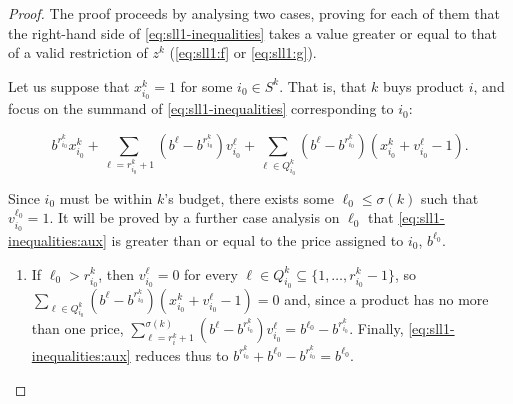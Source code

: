 \begin{proof}
    The proof proceeds by analysing two cases, proving for each of them that the
    right-hand side of \eqref{eq:sll1-inequalities} takes a value greater or
    equal to that of a valid restriction of $z^k$ (\eqref{eq:sll1:f} or
    \eqref{eq:sll1:g}).

    Let us suppose that $x_{i_0}^k=1$ for some $i_0 \in S^k$. That is, that $k$
    buys product $i$, and focus on the summand of \eqref{eq:sll1-inequalities}
    corresponding to $i_0$:

    \begin{equation}
        b^{r_{i_0}^k}x_{i_0}^k
            + \sum_{\ell = r_{i_0}^k + 1}
                \left(
                    b^\ell - b^{r_{i_0}^k}
                \right) v_{i_0}^\ell
            + \sum_{\ell \in Q_{i_0}^k  }
                \left(
                    b^\ell - b^{r_{i_0}^k}
                \right)
                \left(
                    x_{i_0}^k + v_{i_0}^\ell - 1
                \right).
        \label{eq:sll1-inequalities:aux}
    \end{equation}

    Since $i_0$ must be within $k$'s budget, there exists some $\ell_0 \leq
    \sigma(k)$ such that $v_{i_0}^{\ell_0} = 1$. It will be proved by a further
    case analysis on $\ell_0$ that \eqref{eq:sll1-inequalities:aux} is greater
    than or equal to the price assigned to $i_0$, $b^{\ell_0}$.
    \begin{enumerate}
        
        \item %
            If $\ell_0 > r_{i_0}^k$, then $v_{i_0}^\ell = 0$ for every
            $
                \ell \in Q_{i_0}^k \subseteq \{1, \ldots, r_{i_0}^k - 1\}
            $,
            so
            $
                \sum_{\ell \in Q_{i_0}^k}
                    \left(b^\ell - b^{r_{i_0}^k}\right)\left(x_{i_0}^k + v_{i_0}^\ell - 1\right) = 0
            $
            and, since a product has no more than one price,
            $
                \sum_{\ell = r_i^k + 1}^{\sigma\left(k\right)}
                    \left(b^\ell - b^{r_{i_0}^k}\right)v_{i_0}^\ell
                = b^{\ell_0} - b^{r_{i_0}^k}.
            $
            Finally, \eqref{eq:sll1-inequalities:aux} reduces thus to
            $
                b^{r_{i_0}^k} + b^{\ell_0} - b^{r_{i_0}^k} = b^{\ell_0}.
            $
            

\end{enumerate}
\end{proof}
